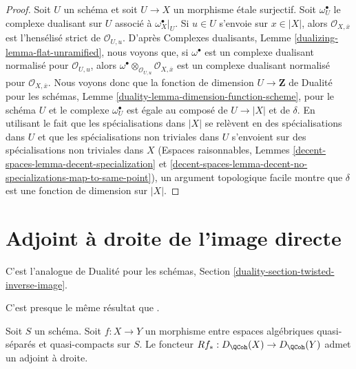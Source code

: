 \begin{proof}
Soit $U$ un schéma et soit $U \to X$ un morphisme \'etale surjectif.
Soit $\omega_U^\bullet$ le complexe dualisant sur $U$ associé
à $\omega_X^\bullet|_U$.
Si $u \in U$ s'envoie sur $x \in |X|$, alors $\mathcal{O}_{X, \overline{x}}$
est l'hensélisé strict de $\mathcal{O}_{U, u}$. D'après
Complexes dualisants, Lemme \ref{dualizing-lemma-flat-unramified},
nous voyons que, si $\omega^\bullet$ est un complexe dualisant normalisé
pour $\mathcal{O}_{U, u}$, alors
$\omega^\bullet \otimes_{\mathcal{O}_{U, u}} \mathcal{O}_{X, \overline{x}}$
est un complexe dualisant normalisé pour $\mathcal{O}_{X, \overline{x}}$.
Nous voyons donc que la fonction de dimension $U \to \mathbf{Z}$ de
Dualité pour les schémas, Lemme \ref{duality-lemma-dimension-function-scheme},
pour le schéma $U$ et le complexe
$\omega_U^\bullet$ est égale au composé de $U \to |X|$ et de $\delta$.
En utilisant le fait que les spécialisations dans $|X|$ se relèvent en des spécialisations dans $U$
et que les spécialisations non triviales dans $U$ s'envoient sur des
spécialisations non triviales dans $X$
(Espaces raisonnables, Lemmes \ref{decent-spaces-lemma-decent-specialization} et
\ref{decent-spaces-lemma-decent-no-specializations-map-to-same-point}),
un argument topologique facile montre que $\delta$ est une fonction de dimension
sur $|X|$.
\end{proof}




 
\section{Adjoint à droite de l'image directe}
\label{section-twisted-inverse-image}

\noindent
C'est l'analogue de Dualité pour les schémas, Section
\ref{duality-section-twisted-inverse-image}.

\begin{lemma}
\label{lemma-twisted-inverse-image}
\begin{reference}
C'est presque le même résultat que \cite[exemple 4.2]{Neeman-Grothendieck}.
\end{reference}
Soit $S$ un schéma.
Soit $f : X \to Y$ un morphisme entre espaces algébriques quasi-séparés et quasi-compacts
sur $S$. Le foncteur $Rf_* : D_\QCoh(X) \to D_\QCoh(Y)$
admet un adjoint à droite.
\end{lemma}

